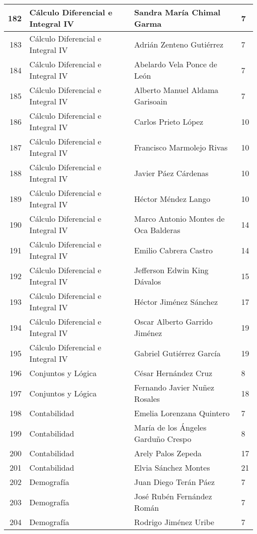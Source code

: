 \begin{table}[ht]
\begin{tabular}{rlll}
  182 & Cálculo Diferencial e Integral IV & Sandra María Chimal Garma & 7 \\ \hline
  183 & Cálculo Diferencial e Integral IV & Adrián Zenteno Gutiérrez & 7 \\ \hline
  184 & Cálculo Diferencial e Integral IV & Abelardo Vela Ponce de León & 7 \\ \hline
  185 & Cálculo Diferencial e Integral IV & Alberto Manuel Aldama Garisoain & 7 \\ \hline
  186 & Cálculo Diferencial e Integral IV & Carlos Prieto López & 10 \\ \hline
  187 & Cálculo Diferencial e Integral IV & Francisco Marmolejo Rivas & 10 \\ \hline
  188 & Cálculo Diferencial e Integral IV & Javier Páez Cárdenas & 10 \\ \hline
  189 & Cálculo Diferencial e Integral IV & Héctor Méndez Lango & 10 \\ \hline
  190 & Cálculo Diferencial e Integral IV & Marco Antonio Montes de Oca Balderas & 14 \\ \hline
  191 & Cálculo Diferencial e Integral IV & Emilio Cabrera Castro & 14 \\ \hline
  192 & Cálculo Diferencial e Integral IV & Jefferson Edwin King Dávalos & 15 \\ \hline
  193 & Cálculo Diferencial e Integral IV & Héctor Jiménez Sánchez & 17 \\ \hline
  194 & Cálculo Diferencial e Integral IV & Oscar Alberto Garrido Jiménez & 19 \\ \hline
  195 & Cálculo Diferencial e Integral IV & Gabriel Gutiérrez García & 19 \\ \hline
  196 & Conjuntos y Lógica & César Hernández Cruz & 8 \\ \hline
  197 & Conjuntos y Lógica & Fernando Javier Nuñez Rosales & 18 \\ \hline
  198 & Contabilidad & Emelia Lorenzana Quintero & 7 \\ \hline
  199 & Contabilidad & María de los Ángeles Garduño Crespo & 8 \\ \hline
  200 & Contabilidad & Arely Palos Zepeda & 17 \\ \hline
  201 & Contabilidad & Elvia Sánchez Montes & 21 \\ \hline
  202 & Demografía & Juan Diego Terán Páez & 7 \\ \hline
  203 & Demografía & José Rubén Fernández Román & 7 \\ \hline
  204 & Demografía & Rodrigo Jiménez Uribe & 7 \\ \hline

\end{tabular}
\end{table}

